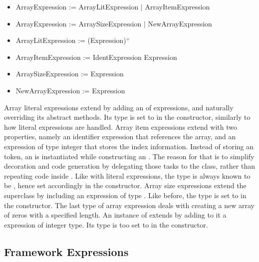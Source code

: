 \begin{itemize}
	\item ArrayExpression := ArrayLitExpression $|$ ArrayItemExpression
	\item ArrayExpression := ArraySizeExpression $|$ NewArrayExpression
	\item ArrayLitExpression := (Expression)$^+$
	\item ArrayItemExpression := IdentExpression Expression
	\item ArraySizeExpression := Expression
	\item NewArrayExpression := Expression
\end{itemize}

Array literal expressions extend  by adding an  of expressions, and naturally overriding its abstract methods. Its type is set to  in the constructor, similarly to how literal expressions are handled. Array item expressions extend  with two properties, namely an identifier expression that references the array, and an expression of type integer that stores the index information. Instead of storing an  token, an  is instantiated while constructing an . The reason for that is to simplify decoration and code generation by delegating those tasks to the  class, rather than repeating code inside . Like with literal expressions, the type is always known to be , hence set accordingly in the constructor. Array size expressions extend the superclass by including an expression of type . Like before, the type is set to  in the constructor. The last type of array expression deals with creating a new array of zeros with a specified length. An instance of  extends  by adding to it a  expression of integer type. Its type is too set to  in the constructor.

\subsection{Framework Expressions}

